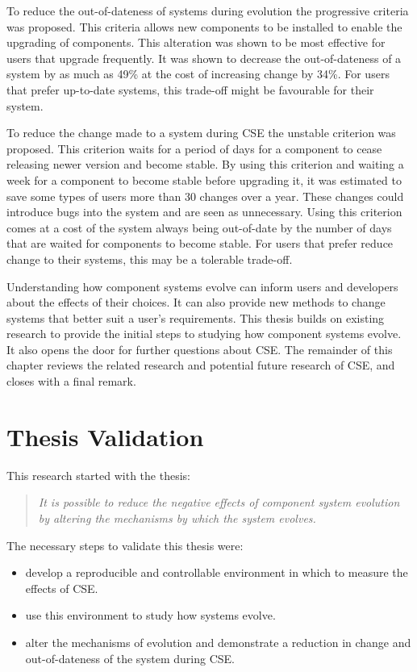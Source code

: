 To reduce the out-of-dateness of systems during evolution the progressive criteria was proposed.
This criteria allows new components to be installed to enable the upgrading of components.
This alteration was shown to be most effective for users that upgrade frequently.
It was shown to decrease the out-of-dateness of a system by as much as 49\% at the cost of increasing change by 34\%.
For users that prefer up-to-date systems, this trade-off might be favourable for their system.

To reduce the change made to a system during CSE the unstable criterion was proposed.
This criterion waits for a period of days for a component to cease releasing newer version and become stable.
By using this criterion and waiting a week for a component to become stable before upgrading it, it was estimated to save some types of users more than 30 changes over a year.
These changes could introduce bugs into the system and are seen as unnecessary. 
Using this criterion comes at a cost of the system always being out-of-date by the number of days that are waited for components to become stable.
For users that prefer reduce change to their systems, this may be a tolerable trade-off.

Understanding how component systems evolve can inform users and developers about the effects of their choices.
It can also provide new methods to change systems that better suit a user's requirements.
This thesis builds on existing research to provide the initial steps to studying how component systems evolve.
It also opens the door for further questions about CSE.
The remainder of this chapter reviews the related research and potential future research of CSE, and closes with a final remark. 

\section{Thesis Validation}
This research started with the thesis:
\begin{quote}
\textit{It is possible to reduce the negative effects of component system evolution by altering the mechanisms by which the system evolves.} 
\end{quote}
The necessary steps to validate this thesis were:
\begin{itemize}
  \item develop a reproducible and controllable environment in which to measure the effects of CSE.
  \item use this environment to study how systems evolve.
  \item alter the mechanisms of evolution and demonstrate a reduction in change and out-of-dateness of the system during CSE.
\end{itemize}

